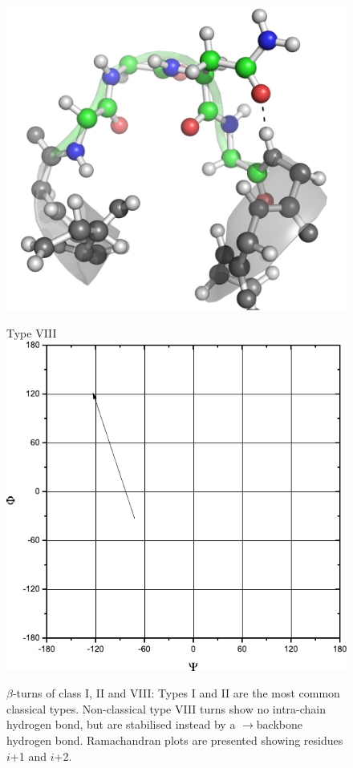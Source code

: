 \begin{figure}[p]
\begin{minipage}[b]{0.5\linewidth}
\centering
\includegraphics[width=1.0\textwidth]{./01-ProteinStructure/turns/beta-type-VIII.png}
\end{minipage}
\hspace{0.5cm}
\begin{minipage}[b]{0.3\linewidth}
\centering
Type VIII
\includegraphics[width=1.0\textwidth]{./01-ProteinStructure/turns/beta-ram-type-VIII.pdf}
\end{minipage}

\caption[$\beta$-turns of class I, II and VIII]{$\beta$-turns of class I, II and VIII: Types I and II are the most common classical types. Non-classical
type VIII turns show no
intra-chain hydrogen bond, but are stabilised instead by a \sidechain$\rightarrow$backbone hydrogen bond. Ramachandran plots are presented showing residues $i$+1 and $i$+2.}
\label{fig:intro:bturn1}

\end{figure}

